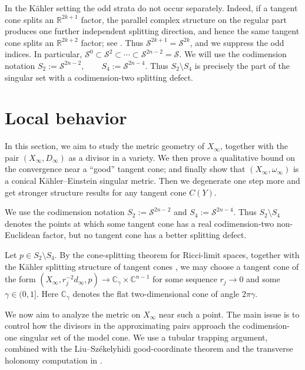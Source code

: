 \documentclass[11pt]{amsart}
\theoremstyle{definition}
\theoremstyle{remark}
\begin{document}
In the K\"ahler setting the odd strata do not occur separately. Indeed, if a
tangent cone splits an $\mathbb R^{2k+1}$ factor, the parallel complex
structure on the regular part produces one further independent splitting
direction, and hence the same tangent cone splits an
$\mathbb R^{2k+2}$ factor; see
\cite[Proposition~B.5]{WangZhuBakryEmery}. Thus $\mathcal S^{2k+1}=\mathcal S^{2k}$, 
and we suppress the odd indices. In particular, $\mathcal S^0\subset\mathcal S^2\subset\cdots
\subset\mathcal S^{2n-2}=\mathcal S$.
We will use the codimension notation $S_2:=\mathcal S^{2n-2},
\qquad
S_4:=\mathcal S^{2n-4}$. 
Thus $S_2\setminus S_4$ is precisely the part of the singular set with a
codimension-two splitting defect.





\section{Local behavior}
\label{sec:local-structure}
In this section, we aim to study the metric geometry of $X_\infty$, together with the pair $(X_\infty, D_\infty)$ as a divisor in a variety. We then prove a qualitative bound on the convergence near a ``good'' tangent cone; and finally show that $(X_\infty, \omega_\infty)$ is a conical K\"ahler--Einstein singular metric. Then we degenerate one step more and get stronger structure results for any tangent cone $C(Y)$. 

We use the codimension notation $S_2:=\mathcal S^{2n-2}$ and
$S_4:=\mathcal S^{2n-4}$. Thus $S_2\setminus S_4$ denotes the points at which
some tangent cone has a real codimension-two non-Euclidean factor, but no tangent
cone has a better splitting defect.

Let $p\in S_2\setminus S_4$. By the cone-splitting theorem for Ricci-limit
spaces, together with the K\"ahler splitting structure of tangent cones
\cite{CheegerColdingII,CheegerJiangNaber,SLI}, we may choose a tangent cone of the form
$(X_\infty,r_j^{-2}d_\infty,p)\to \mathbb C_\gamma\times\mathbb C^{n-1}$ for
some sequence $r_j\to0$ and some $\gamma\in(0,1]$. Here $\mathbb C_\gamma$
denotes the flat two-dimensional cone of angle $2\pi\gamma$.

We now aim to analyze the metric on $X_\infty$ near such a point. The main issue
is to control how the divisors in the approximating pairs approach the
codimension-one singular set of the model cone. We use a tubular trapping
argument, combined with the Liu--Sz\'ekelyhidi good-coordinate theorem
\cite[Theorem~1.4 and Proposition~3.2]{SLI} and the transverse holonomy
computation in \cite[proof of Proposition~13]{CDSII}.
\end{document}
